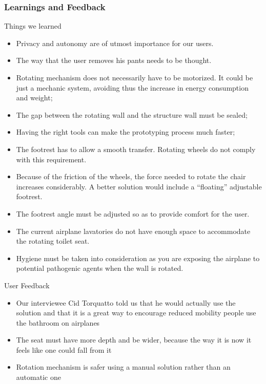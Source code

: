 \subsubsection{Learnings and Feedback}
Things we learned \\
\begin{itemize}
	\item Privacy and autonomy are of utmost importance for our users.
	\item The way that the user removes his pants needs to be thought.
	\item Rotating mechanism does not necessarily have to be motorized. It could be just a mechanic system, avoiding thus the increase in energy consumption and weight;
	\item The gap between the rotating wall and the structure wall must be sealed;
	\item Having the right tools can make the prototyping process much faster;
	\item The footrest has to allow a smooth transfer. Rotating wheels do not comply with this requirement. 
	\item Because of the friction of the wheels, the force needed to rotate the chair increases considerably. A better solution would include a “floating” adjustable footrest.
	\item 	The footrest angle must be adjusted so as to provide comfort for the user.
	\item 	The current airplane lavatories do not have enough space to accommodate the rotating toilet seat.
	\item Hygiene must be taken into consideration as you are exposing the airplane to potential pathogenic agents when the wall is rotated.
\end{itemize}

User Feedback \\

\begin{itemize}
	\item Our interviewee Cid Torquatto told us that he would actually use the solution and that it is a great way to encourage reduced mobility people use the bathroom on airplanes
	\item The seat must have more depth and be wider, because the way it is now it feels like one could fall from it
	\item Rotation mechanism is safer using a manual solution rather than an automatic one
\end{itemize}

